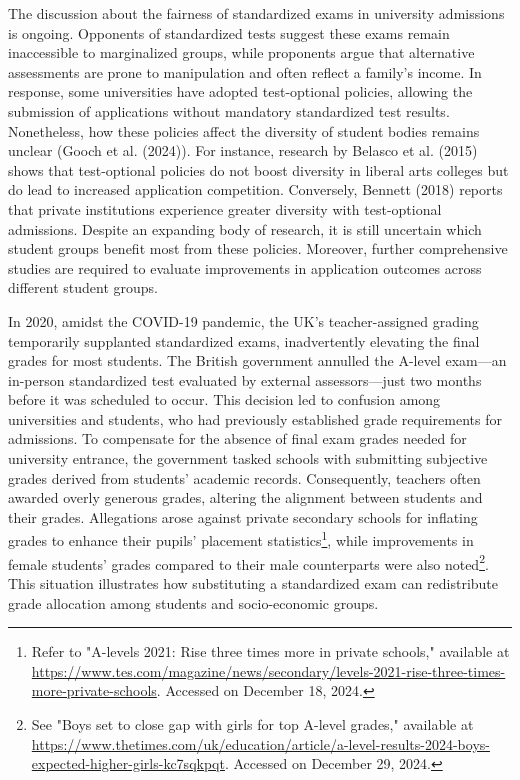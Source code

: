 The discussion about the fairness of standardized exams in university admissions is ongoing. Opponents of standardized tests suggest these exams remain inaccessible to marginalized groups, while proponents argue that alternative assessments are prone to manipulation and often reflect a family's income. In response, some universities have adopted test-optional policies, allowing the submission of applications without mandatory standardized test results. Nonetheless, how these policies affect the diversity of student bodies remains unclear (Gooch et al. (2024)). For instance, research by Belasco et al. (2015) shows that test-optional policies do not boost diversity in liberal arts colleges but do lead to increased application competition. Conversely, Bennett (2018) reports that private institutions experience greater diversity with test-optional admissions. Despite an expanding body of research, it is still uncertain which student groups benefit most from these policies. Moreover, further comprehensive studies are required to evaluate improvements in application outcomes across different student groups.

In 2020, amidst the COVID-19 pandemic, the UK's teacher-assigned grading temporarily supplanted standardized exams, inadvertently elevating the final grades for most students. The British government annulled the A-level exam—an in-person standardized test evaluated by external assessors—just two months before it was scheduled to occur. This decision led to confusion among universities and students, who had previously established grade requirements for admissions. To compensate for the absence of final exam grades needed for university entrance, the government tasked schools with submitting subjective grades derived from students' academic records. Consequently, teachers often awarded overly generous grades, altering the alignment between students and their grades. Allegations arose against private secondary schools for inflating grades to enhance their pupils' placement statistics\footnote{Refer to "A-levels 2021: Rise three times more in private schools," available at \url{https://www.tes.com/magazine/news/secondary/levels-2021-rise-three-times-more-private-schools}. Accessed on December 18, 2024.}, while improvements in female students' grades compared to their male counterparts were also noted\footnote{See "Boys set to close gap with girls for top A-level grades," available at \url{https://www.thetimes.com/uk/education/article/a-level-results-2024-boys-expected-higher-girls-kc7sqkpqt}. Accessed on December 29, 2024.}. This situation illustrates how substituting a standardized exam can redistribute grade allocation among students and socio-economic groups.


